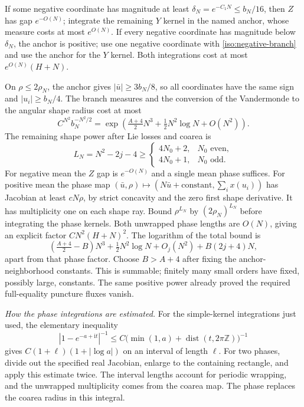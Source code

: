 \documentclass[11pt]{article}
\numberwithin{equation}{section}
\theoremstyle{definition}
\newcommand{\Z}{\mathbb Z}
\newcommand{\ii}{\mathrm i}
\DeclareMathOperator{\dist}{dist}
\begin{document}
If some negative coordinate has magnitude at least
$\delta_N=e^{-C_1N}\le b_N/16$, then $Z$ has gap $e^{-O(N)}$;
integrate the remaining $Y$ kernel in the named anchor, whose measure
costs at most $e^{O(N)}$. If every negative coordinate has magnitude
below $\delta_N$, the anchor is positive; use one negative coordinate
with \eqref{iso:negative-branch} and use the anchor for the $Y$ kernel.
Both integrations cost at most $e^{O(N)}(H+N)$.

On $\rho\le2\rho_N$, the anchor gives
$|\bar u|\ge3b_N/8$, so all coordinates have the same sign and
$|u_i|\ge b_N/4$. The branch measures and the conversion of the
Vandermonde to the angular shape radius cost at most
\[
 C^{N^2}b_N^{-N^2/2}
 =\exp\left(\tfrac{A+4}{2}N^3+\tfrac12N^2\log N+O(N^2)\right).
\]
The remaining shape power after Lie losses and coarea is
\[
 L_N=N^2-2j-4\ge
 \begin{cases}4N_0+2,&N_0\text{ even},\\4N_0+1,&N_0\text{ odd}.
 \end{cases}
\]
For negative mean the $Z$ gap is $e^{-O(N)}$ and a single mean phase
suffices. For positive mean the phase map
$(\bar u,\rho)\mapsto(N\bar u+\text{constant},\sum_i x(u_i))$
has Jacobian at least $cN\rho$, by strict concavity and the zero first
shape derivative. It has multiplicity one on each shape ray.
Bound $\rho^{L_N}$ by $(2\rho_N)^{L_N}$ before integrating the
phase kernels. Both unwrapped phase lengths are $O(N)$, giving an
explicit factor $CN^2(H+N)^2$. The logarithm of the total bound is
\[
 \left(\tfrac{A+4}{2}-B\right)N^3+\tfrac12N^2\log N
 +O_j(N^2)+B(2j+4)N,
\]
apart from that phase factor. Choose $B>A+4$ after fixing the
anchor-neighborhood constants. This is summable; finitely many small
orders have fixed, possibly large, constants. The same positive power
already proved the required full-equality puncture fluxes vanish.

\emph{How the phase integrations are estimated.}
For the simple-kernel integrations just used, the elementary inequality
\[
 |1-e^{-a+\ii t}|^{-1}
 \le C\bigl(\min(1,a)+\dist(t,2\pi\Z)\bigr)^{-1}
\]
gives $C(1+\ell)(1+|\log a|)$ on an interval of length $\ell$.
For two phases, divide out the specified real Jacobian, enlarge to the
containing rectangle, and apply this estimate twice. The interval
lengths account for periodic wrapping, and the unwrapped multiplicity
comes from the coarea map. The phase replaces the coarea radius in
this integral.
\end{document}
